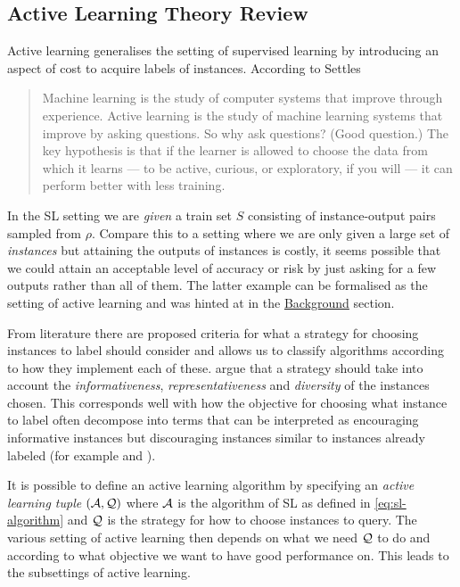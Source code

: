 \subsection{Active Learning Theory Review} Active learning generalises the
setting of supervised learning by introducing an aspect of cost to acquire
labels of instances. According to Settles \cite[Preface]{settles12_activ_learn}
\begin{quote}
  Machine learning is the study of computer systems that improve through experience. Active learning
  is the study of machine learning systems that improve by asking questions. So why ask questions?
  (Good question.) The key hypothesis is that if the learner is allowed to choose the data from which
  it learns — to be active, curious, or exploratory, if you will — it can perform better with less training.
\end{quote}
In the SL setting we are \emph{given} a train set \(S\) consisting
of instance-output pairs sampled from \(\rho\). Compare this to a setting
where we are only given a large set of \emph{instances} but attaining the
outputs of instances is costly, it seems possible that we could attain an
acceptable level of accuracy or risk by just asking for a few outputs rather
than all of them. The latter example can be formalised as the setting of active
learning and was hinted at in the \hyperref[sec:background]{Background} section.

From literature there are proposed criteria for what a strategy for choosing
instances to label should consider and allows us to classify algorithms
according to how they implement each of these.
\cite{wu18_pool_based_sequen_activ_learn_regres} argue that a strategy should
take into account the \emph{informativeness}, \emph{representativeness} and
\emph{diversity} of the instances chosen. This corresponds well with how the
objective for choosing what instance to label often decompose into terms that
can be interpreted as encouraging informative instances but discouraging instances similar to instances already labeled (for
example \cite[Equation 4]{guo08_discr} and \cite[Equation
7]{chattopadhyay13_batch_mode_activ_sampl_based}).

It is possible to define an active learning algorithm by specifying an
\emph{active learning tuple} \((\mathcal{A}, \mathcal{Q})\) where \(\mathcal{A}\) is the
algorithm of SL as defined in \ref{eq:sl-algorithm} and \(\mathcal{Q}\) is the strategy for how to choose instances
to query. The various setting of active learning then depends on what we need
\(\mathcal{Q}\) to do and according to what objective we want to have good
performance on. This leads to the subsettings of active learning.

